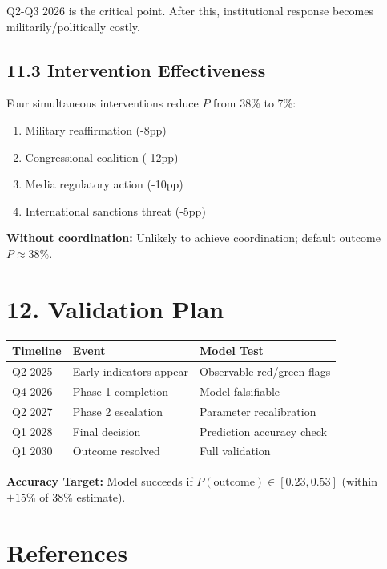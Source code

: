 \documentclass[11pt]{article}
\begin{document}
Q2-Q3 2026 is the critical point. After this, institutional response becomes militarily/politically costly.

\subsection{11.3 Intervention Effectiveness}

Four simultaneous interventions reduce $P$ from 38\% to 7\%:
\begin{enumerate}
\item Military reaffirmation (-8pp)
\item Congressional coalition (-12pp)
\item Media regulatory action (-10pp)
\item International sanctions threat (-5pp)
\end{enumerate}

\textbf{Without coordination:} Unlikely to achieve coordination; default outcome $P \approx 38\%$.

\section{12. Validation Plan}

\begin{table}[h]
\centering
\begin{tabular}{|l|l|l|}
\hline
\textbf{Timeline} & \textbf{Event} & \textbf{Model Test} \\
\hline
Q2 2025 & Early indicators appear & Observable red/green flags \\
Q4 2026 & Phase 1 completion & Model falsifiable \\
Q2 2027 & Phase 2 escalation & Parameter recalibration \\
Q1 2028 & Final decision & Prediction accuracy check \\
Q1 2030 & Outcome resolved & Full validation \\
\hline
\end{tabular}
\end{table}

\textbf{Accuracy Target:} Model succeeds if $P(\text{outcome}) \in [0.23, 0.53]$ (within $\pm 15\%$ of 38\% estimate).


\section{References}
\end{document}
